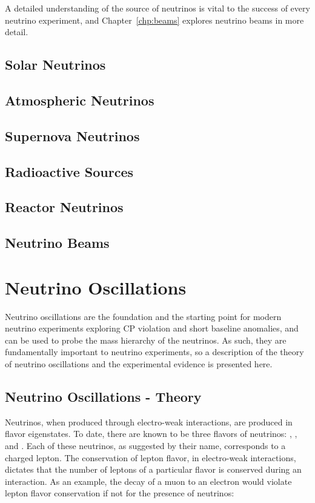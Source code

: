 A detailed understanding of the source of neutrinos is vital to the success of every neutrino experiment, and Chapter~\ref{chp:beams} explores neutrino beams in more detail.

\subsection{Solar Neutrinos}

\subsection{Atmospheric Neutrinos}

\subsection{Supernova Neutrinos}

\subsection{Radioactive Sources}

\subsection{Reactor Neutrinos}

\subsection{Neutrino Beams}

\section{Neutrino Oscillations}

Neutrino oscillations \cite{Bilenky:1978nj, Maki:1962mu, Langacker:1988up} are the foundation and the starting point for modern neutrino experiments exploring CP violation and short baseline anomalies, and can be used to probe the mass hierarchy of the neutrinos.  As such, they are fundamentally important to neutrino experiments, so a description of the theory of neutrino oscillations and the experimental evidence is presented here.

\subsection{Neutrino Oscillations - Theory}


Neutrinos, when produced through electro-weak interactions, are produced in flavor eigenstates.  To date, there are known to be three flavors of neutrinos: \nue, \numu, and \nutau.  Each of these neutrinos, as suggested by their name, corresponds to a charged lepton.  The conservation of lepton flavor, in electro-weak interactions, dictates that the number of leptons of a particular flavor is conserved during an interaction.  As an example, the decay of a muon to an electron would violate lepton flavor conservation if not for the presence of neutrinos:

